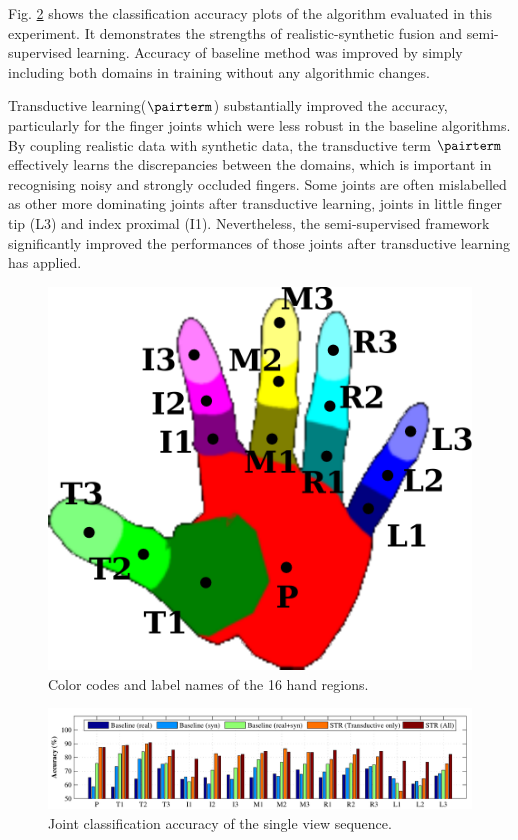 Fig. \ref{fig/hand/single} shows the classification accuracy plots of the algorithm evaluated in this experiment.  
It demonstrates the strengths of realistic-synthetic fusion and semi-supervised learning. 
Accuracy of baseline method was improved by simply including both domains in training without any algorithmic changes. 

Transductive learning($\pairterm$) substantially improved the accuracy, particularly for the finger joints which were less robust in the baseline algorithms.  
By coupling realistic data with synthetic data, the transductive term $\pairterm$ effectively learns the discrepancies between the domains, which is important in recognising noisy and strongly occluded fingers.
Some joints are often mislabelled as other more dominating joints after transductive learning, \eg joints in little finger tip (L3) and index proximal (I1). Nevertheless, the semi-supervised framework significantly improved the performances of those joints after transductive learning has applied.  

\begin{figure}[ht]
	\centering
	\includegraphics[width=0.22\linewidth]{fig/hand/hand.pdf}
	\caption{Color codes and label names of the 16 hand regions.}
	\label{fig/hand/label}
\end{figure}

\begin{figure}[ht]
	\centering
	\includegraphics[width=1\linewidth]{fig/hand/singleview.pdf}
	\caption{Joint classification accuracy of the single view sequence.}
	\label{fig/hand/single}
\end{figure}

